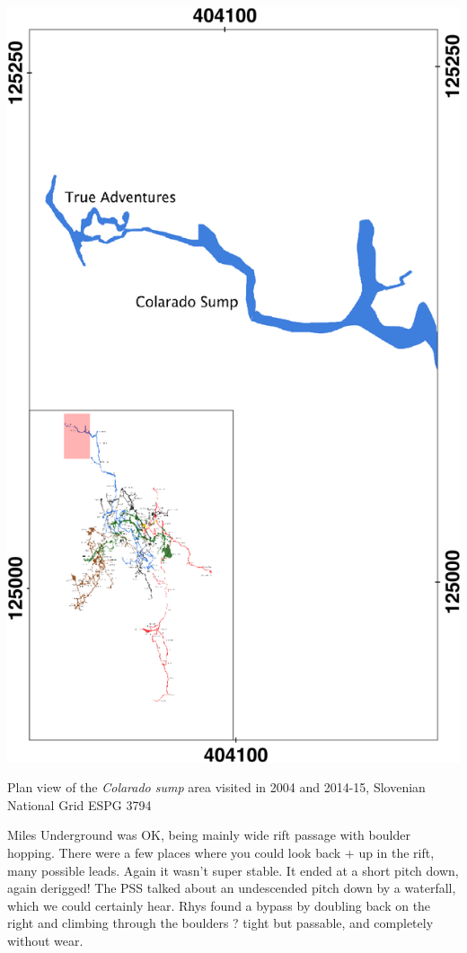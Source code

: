 \begin{marginfigure}
\checkoddpage \ifoddpage \forcerectofloat \else \forceversofloat \fi
\centering
 \includegraphics[width=\linewidth]{2014/jarv-2014/colarado_inset}
 \caption{Plan view of the \emph{Colarado sump} area visited in 2004 and 2014-15, Slovenian National Grid ESPG 3794}
 \label{Red Cow inset}
\end{marginfigure}

Miles Underground was OK, being mainly wide rift passage with boulder hopping. There were a few places where you could look back + up in the rift, many possible leads. Again it wasn't super stable. It ended at a short pitch down, again derigged! The PSS talked about an undescended pitch down by a waterfall, which we could certainly hear.
Rhys found a bypass by doubling back on the right and climbing through the boulders ? tight but passable, and completely without wear.



